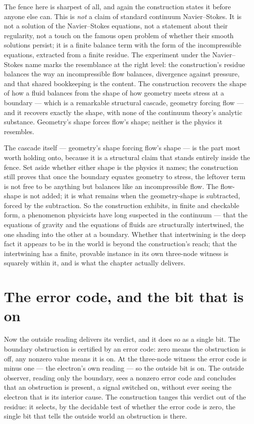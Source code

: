 The fence here is sharpest of all, and again the construction states it before anyone else can. This is
\emph{not} a claim of standard continuum Navier--Stokes. It is not a solution of the Navier--Stokes
equations, not a statement about their regularity, not a touch on the famous open problem of whether
their smooth solutions persist; it is a finite balance term with the form of the incompressible equations,
extracted from a finite residue. The experiment under the Navier--Stokes name marks the resemblance at
the right level: the construction's residue balances the way an incompressible flow balances, divergence
against pressure, and that shared bookkeeping is the content. The construction recovers the shape of how a
fluid balances from the shape of how geometry meets stress at a boundary --- which is a remarkable
structural cascade, geometry forcing flow --- and it recovers exactly the shape, with none of the
continuum theory's analytic substance. Geometry's shape forces flow's shape; neither is the physics it
resembles.

The cascade itself --- geometry's shape forcing flow's shape --- is the part most worth holding onto,
because it is a structural claim that stands entirely inside the fence. Set aside whether either shape is
the physics it names; the construction still proves that once the boundary equates geometry to stress, the
leftover term is not free to be anything but balances like an incompressible flow. The flow-shape is not
added; it is what remains when the geometry-shape is subtracted, forced by the subtraction. So the
construction exhibits, in finite and checkable form, a phenomenon physicists have long suspected in the
continuum --- that the equations of gravity and the equations of fluids are structurally intertwined, the
one shading into the other at a boundary. Whether that intertwining is the deep fact it appears to be in
the world is beyond the construction's reach; that the intertwining has a finite, provable instance in its
own three-node witness is squarely within it, and is what the chapter actually delivers.

\section{The error code, and the bit that is on}
\label{se:the-error-code-and-the-bit-that-is-on}

Now the outside reading delivers its verdict, and it does so as a single bit. The boundary obstruction is
certified by an error code: zero means the obstruction is off, any nonzero value means it is on. At the
three-node witness the error code is minus one --- the electron's own reading --- so the outside bit is
on. The outside observer, reading only the boundary, sees a nonzero error code and concludes that an
obstruction is present, a signal switched on, without ever seeing the electron that is its interior
cause. The construction tanges this verdict out of the residue: it selects, by the decidable test of
whether the error code is zero, the single bit that tells the outside world an obstruction is there.

